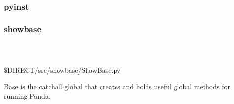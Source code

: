 \documentclass[a4paper]{article}
\begin{document}
\clearpage\subsubsection[pyinst]{pyinst}
\hypertarget{RefHeading18331167907073}{}\subsubsection{}
\clearpage\subsubsection[showbase]{showbase}
\hypertarget{RefHeading18351167907073}{}\subsubsection[\ \ \ \ ]{\ \ \ \ }
\hypertarget{RefHeading3585869075401}{}{\color{black}
\$DIRECT/src/showbase/ShowBase.py}

{\color{black}
Base is the catchall global that creates and holds useful global methods for running Panda.}


\bigskip
\end{document}

